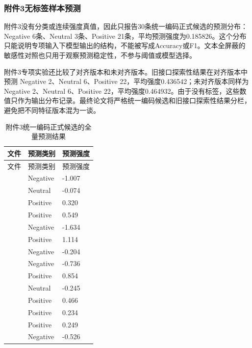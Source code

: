 \documentclass{gmcmthesis}
\begin{document}
\subsubsection{附件3无标签样本预测}
附件3没有分类或连续强度真值，因此只报告30条统一编码正式候选的预测分布：Negative 6条、Neutral 3条、Positive 21条，平均预测强度为0.185826。这个分布只能说明专项输入下模型输出的结构，不能被写成Accuracy或F1。文本全屏蔽的敏感性对照也只用于观察预测稳定性，不参与阈值或模型选择。
\par\indent 附件3专项实验还比较了对齐版本和未对齐版本。旧接口探索性结果在对齐版本中预测 Negative 2、Neutral 6、Positive 22，平均强度0.436542；未对齐版本同样为 Negative 2、Neutral 6、Positive 22，平均强度0.464932。由于没有标签，这些数值只作为输出分布记录。最终论文将严格统一编码候选和旧接口探索性结果分栏，避免把不同特征版本混为一谈。
\begin{longtable}{C{0.33\textwidth}C{0.22\textwidth}C{0.22\textwidth}}
\caption{附件3统一编码正式候选的全量预测结果}\label{tab:attachment3_full}\\
\toprule 文件 & 预测类别 & 预测强度 \\
\midrule
\endfirsthead
\toprule 文件 & 预测类别 & 预测强度 \\
\midrule
\endhead
\texttt{} & Negative & -1.007 \\
\texttt{} & Neutral & -0.074 \\
\texttt{} & Positive & 0.320 \\
\texttt{} & Positive & 0.549 \\
\texttt{} & Negative & -1.634 \\
\texttt{} & Positive & 1.114 \\
\texttt{} & Negative & -0.204 \\
\texttt{} & Negative & -0.736 \\
\texttt{} & Positive & 0.854 \\
\texttt{} & Neutral & -0.245 \\
\texttt{} & Positive & 0.466 \\
\texttt{} & Positive & 0.234 \\
\texttt{} & Positive & 0.249 \\
\texttt{} & Negative & -0.526 \\

\end{longtable}
\end{document}
